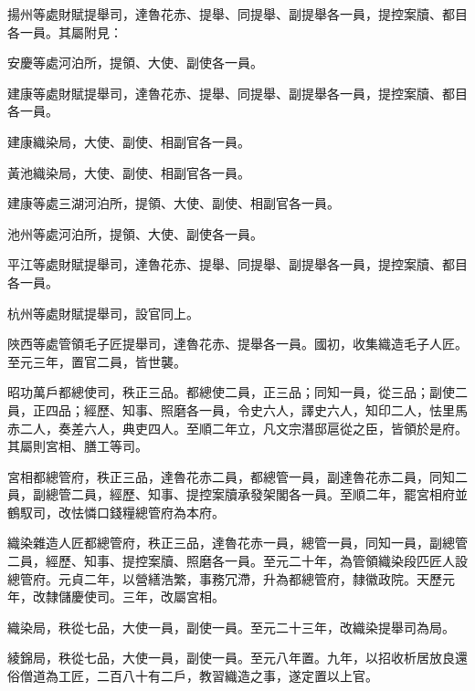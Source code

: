 \begin{pinyinscope}
 揚州等處財賦提舉司，達魯花赤、提舉、同提舉、副提舉各一員，提控案牘、都目各一員。其屬附見：



 安慶等處河泊所，提領、大使、副使各一員。



 建康等處財賦提舉司，達魯花赤、提舉、同提舉、副提舉各一員，提控案牘、都目各一員。



 建康織染局，大使、副使、相副官各一員。



 黃池織染局，大使、副使、相副官各一員。



 建康等處三湖河泊所，提領、大使、副使、相副官各一員。



 池州等處河泊所，提領、大使、副使各一員。



 平江等處財賦提舉司，達魯花赤、提舉、同提舉、副提舉各一員，提控案牘、都目各一員。



 杭州等處財賦提舉司，設官同上。



 陜西等處管領毛子匠提舉司，達魯花赤、提舉各一員。國初，收集織造毛子人匠。至元三年，置官二員，皆世襲。



 昭功萬戶都總使司，秩正三品。都總使二員，正三品；同知一員，從三品；副使二員，正四品；經歷、知事、照磨各一員，令史六人，譯史六人，知印二人，怯里馬赤二人，奏差六人，典吏四人。至順二年立，凡文宗潛邸扈從之臣，皆領於是府。其屬則宮相、膳工等司。



 宮相都總管府，秩正三品，達魯花赤二員，都總管一員，副達魯花赤二員，同知二員，副總管二員，經歷、知事、提控案牘承發架閣各一員。至順二年，罷宮相府並鶴馭司，改怯憐口錢糧總管府為本府。



 織染雜造人匠都總管府，秩正三品，達魯花赤一員，總管一員，同知一員，副總管二員，經歷、知事、提控案牘、照磨各一員。至元二十年，為管領織染段匹匠人設總管府。元貞二年，以營繕浩繁，事務冗滯，升為都總管府，隸徽政院。天歷元年，改隸儲慶使司。三年，改屬宮相。



 織染局，秩從七品，大使一員，副使一員。至元二十三年，改織染提舉司為局。



 綾錦局，秩從七品，大使一員，副使一員。至元八年置。九年，以招收析居放良還俗僧道為工匠，二百八十有二戶，教習織造之事，遂定置以上官。




\end{pinyinscope}
